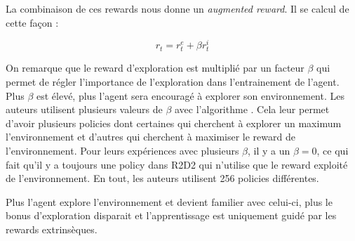La combinaison de ces rewards nous donne un \textit{augmented reward}. Il se calcul de cette façon :

$$ r_t = r^e_t + \beta r^i_t $$

On remarque que le reward d'exploration est multiplié par un facteur $\beta$ qui permet de régler l'importance de l'exploration dans l'entrainement de l'agent. Plus $\beta$ est élevé, plus l'agent sera encouragé à explorer son environnement. Les auteurs utilisent plusieurs valeurs de $\beta$ avec l'algorithme . Cela leur permet d'avoir plusieurs policies dont certaines qui cherchent à explorer un maximum l'environnement et d'autres qui cherchent à maximiser le reward de l'environnement. Pour leurs expériences avec plusieurs $\beta$, il y a un $\beta = 0$, ce qui fait qu'il y a toujours une policy dans R2D2 qui n'utilise que le reward exploité de l'environnement. En tout, les auteurs utilisent 256 policies différentes.

Plus l'agent explore l'environnement et devient familier avec celui-ci, plus le bonus d'exploration disparait et l'apprentissage est uniquement guidé par les rewards extrinsèques.